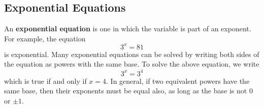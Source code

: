\documentclass[10pt,]{book}
\newcommand{\terminology}[1]{\textbf{#1}}
\theoremstyle{plain}
\theoremstyle{definition}
\theoremstyle{definition}
\theoremstyle{definition}
\theoremstyle{definition}
\theoremstyle{definition}
\numberwithin{equation}{section}
\begin{document}
\typeout{************************************************}
\typeout{************************************************}
\subsection[Exponential Equations]{Exponential Equations}\label{subsection-94}

	An \terminology{exponential equation} is one in which the variable is part of an exponent. For example, the equation
	\begin{equation*}3^x = 81\end{equation*}
	is exponential. Many exponential equations can be solved by writing both sides of the equation as powers with the same base. To solve the above equation, we write
	\begin{equation*}3^x = 3^4\end{equation*}
	which is true if and only if \(x = 4\). In general, if two equivalent powers have the same base, then their exponents must be equal also, as long as the base is not \(0\) or \(\pm 1\).
%
\par
\end{document}
